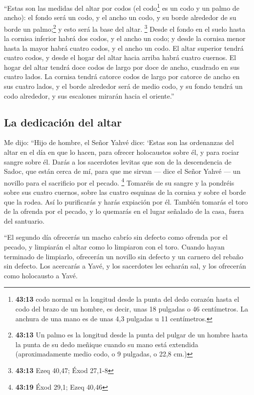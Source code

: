 \begin{paracol}{2}
 ``Estas son las medidas del altar por codos (el
codo\footnote{\textbf{43:13} codo normal es la longitud desde la punta
  del dedo corazón hasta el codo del brazo de un hombre, es decir, unas
  18 pulgadas o 46 centímetros. La anchura de una mano es de unas 4,3
  pulgadas u 11 centímetros.} es un codo y un palmo de ancho): el fondo
será un codo, y el ancho un codo, y su borde alrededor de su borde un
palmo;\footnote{\textbf{43:13} Un palmo es la longitud desde la punta
  del pulgar de un hombre hasta la punta de su dedo meñique cuando su
  mano está extendida (aproximadamente medio codo, o 9 pulgadas, o 22,8
  cm.)} y esto será la base del altar. \footnote{\textbf{43:13} Ezeq
  40,47; Éxod 27,1-8}  Desde el fondo en el suelo hasta
la cornisa inferior habrá dos codos, y el ancho un codo; y desde la
cornisa menor hasta la mayor habrá cuatro codos, y el ancho un codo.
 El altar superior tendrá cuatro codos, y desde el hogar
del altar hacia arriba habrá cuatro cuernos.  El hogar
del altar tendrá doce codos de largo por doce de ancho, cuadrado en sus
cuatro lados.  La cornisa tendrá catorce codos de largo
por catorce de ancho en sus cuatro lados, y el borde alrededor será de
medio codo, y su fondo tendrá un codo alrededor, y sus escalones mirarán
hacia el oriente.''

\hypertarget{la-dedicaciuxf3n-del-altar}{%
\subsection{La dedicación del altar}\label{la-dedicaciuxf3n-del-altar}}

 Me dijo: ``Hijo de hombre, el Señor Yahvé dice: `Estas
son las ordenanzas del altar en el día en que lo hacen, para ofrecer
holocaustos sobre él, y para rociar sangre sobre él. 
Darás a los sacerdotes levitas que son de la descendencia de Sadoc, que
están cerca de mí, para que me sirvan --- dice el Señor Yahvé --- un
novillo para el sacrificio por el pecado. \footnote{\textbf{43:19} Éxod
  29,1; Ezeq 40,46}  Tomaréis de su sangre y la pondréis
sobre sus cuatro cuernos, sobre las cuatro esquinas de la cornisa y
sobre el borde que la rodea. Así lo purificarás y harás expiación por
él.  También tomarás el toro de la ofrenda por el pecado,
y lo quemarás en el lugar señalado de la casa, fuera del santuario.

 ``El segundo día ofrecerás un macho cabrío sin defecto
como ofrenda por el pecado, y limpiarán el altar como lo limpiaron con
el toro.  Cuando hayan terminado de limpiarlo, ofrecerán
un novillo sin defecto y un carnero del rebaño sin defecto.
 Los acercarás a Yavé, y los sacerdotes les echarán sal,
y los ofrecerán como holocausto a Yavé.


\end{paracol}
